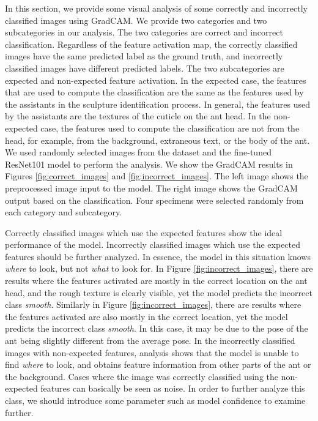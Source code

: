 \documentclass{aci}
\numberwithin{equation}{section}
\begin{document}
In this section, we provide some visual analysis of some correctly and
incorrectly classified images using GradCAM. We provide two categories and two
subcategories in our analysis. The two categories are correct and incorrect
classification. Regardless of the feature activation map, the correctly
classified images have the same predicted label as the ground truth, and
incorrectly classified images have different predicted labels. The two
subcategories are expected and non-expected feature activation. In the expected
case, the features that are used to compute the classification are the same as
the features used by the assistants in the sculpture identification process. In
general, the features used by the assistants are the textures of the cuticle on
the ant head. In the non-expected case, the features used to compute the
classification are not from the head, for example, from the background,
extraneous text, or the body of the ant. We used randomly selected images from
the dataset and the fine-tuned ResNet101 model to perform the analysis. We show
the GradCAM results in Figures \ref{fig:correct_images} and
\ref{fig:incorrect_images}. The left image shows the preprocessed image input
to the model. The right image shows the GradCAM output based on the
classification. Four specimens were selected randomly from each category and
subcategory.

Correctly classified images which use the expected features show the ideal
performance of the model. Incorrectly classified images which use the expected
features should be further analyzed. In essence, the model in this situation
knows \textit{where} to look, but not \textit{what} to look for. In Figure
\ref{fig:incorrect_images}, there are results where the features activated are
mostly in the correct location on the ant head, and the rough texture is clearly
visible, yet the model predicts the incorrect class \textit{smooth}. Similarly
in Figure \ref{fig:incorrect_images}, there are results where the features
activated are also mostly in the correct location, yet the model predicts the
incorrect class \textit{smooth}. In this case, it may be due to the pose of the
ant being slightly different from the average pose. In the incorrectly
classified images with non-expected features, analysis shows that the model is
unable to find \textit{where} to look, and obtains feature information from
other parts of the ant or the background. Cases where the image was correctly
classified using the non-expected features can basically be seen as noise. In
order to further analyze this class, we should introduce some parameter such as
model confidence to examine further.
\end{document}
